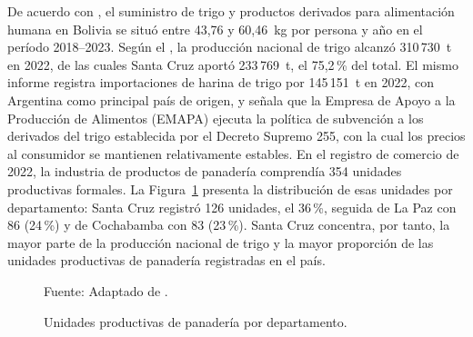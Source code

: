 De acuerdo con \textcite{fao2026fbs}, el suministro de trigo y productos
derivados para alimentación humana en Bolivia se situó entre 43,76 y
60,46~kg por persona y año en el período 2018--2023. Según el
\textcite{mdpyep2023trigo}, la producción nacional de trigo alcanzó
310\,730~t en 2022, de las cuales Santa Cruz aportó 233\,769~t, el
75,2\,\% del total. El mismo informe registra importaciones de harina de
trigo por 145\,151~t en 2022, con Argentina como principal país de origen,
y señala que la Empresa de Apoyo a la Producción de Alimentos (EMAPA)
ejecuta la política de subvención a los derivados del trigo establecida por
el Decreto Supremo 255, con la cual los precios al consumidor se mantienen
relativamente estables. En el registro de comercio de 2022, la industria de
productos de panadería comprendía 354 unidades productivas formales. La
Figura~\ref{fig:empresas_panaderia_departamento} presenta la distribución de
esas unidades por departamento: Santa Cruz registró 126 unidades, el
36\,\%, seguida de La Paz con 86 (24\,\%) y de Cochabamba con 83 (23\,\%).
Santa Cruz concentra, por tanto, la mayor parte de la producción nacional de
trigo y la mayor proporción de las unidades productivas de panadería
registradas en el país.

\begin{figure}[H]
    \centering

    {\setlength{\fboxsep}{6pt}
    \fbox{%
        
    }}

    \caption{Unidades productivas de panadería por departamento.}
    \label{fig:empresas_panaderia_departamento}

    \vspace{0.2em}
    {\footnotesize Fuente: Adaptado de \textcite{mdpyep2023trigo}.}

\end{figure}

